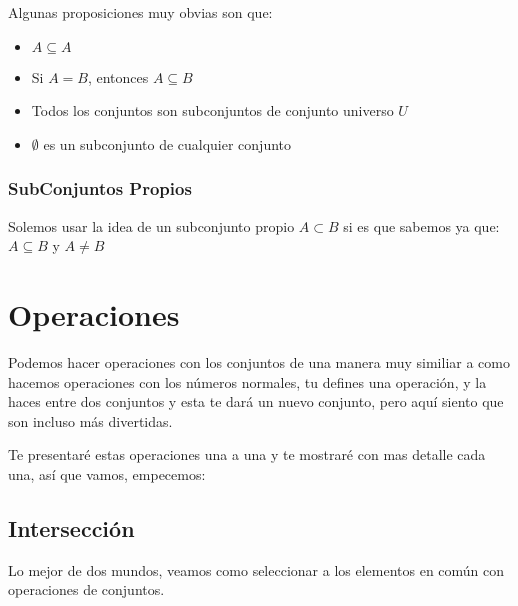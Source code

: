 \documentclass[12pt]{report}                                    %
\begin{document}
                Algunas proposiciones muy obvias son que:
                \begin{itemize}
                    \item $A \subseteq A$
                    \item Si $A = B$, entonces $A \subseteq B$
                    \item Todos los conjuntos son subconjuntos de conjunto universo $U$
                    \item $\emptyset$ es un subconjunto de cualquier conjunto
                \end{itemize}

            \subsubsection{SubConjuntos Propios}

                Solemos usar la idea de un subconjunto propio $A \subset B$ si es que sabemos ya que:
                $A \subseteq B$ y $A \neq B$





    \clearpage
    \section{Operaciones}

        Podemos hacer operaciones con los conjuntos de una manera muy similiar a como hacemos
        operaciones con los números normales, tu defines una operación, y la haces entre dos conjuntos
        y esta te dará un nuevo conjunto,  pero aquí siento que son incluso más divertidas.

        Te presentaré estas operaciones una a una y te mostraré con mas detalle cada una, así 
        que vamos, empecemos:

        \subsection{Intersección}

            Lo mejor de dos mundos, veamos como seleccionar a los elementos en común con operaciones
            de conjuntos.
\end{document}

